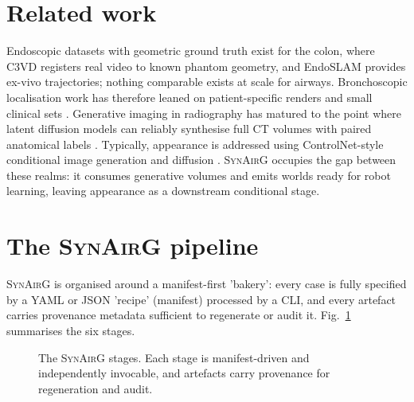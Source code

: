 \documentclass[conference]{IEEEtran}
\newcommand{\synairg}{\textsc{SynAirG}}
\begin{document}
\section{Related work}
Endoscopic datasets with geometric ground truth exist for the colon, where C3VD \cite{bobrow2023c3vd} registers real video to known phantom geometry, and EndoSLAM \cite{ozyoruk2021endoslam} provides ex-vivo trajectories; nothing comparable exists at scale for airways. Bronchoscopic localisation work has therefore leaned on patient-specific renders and small clinical sets \cite{visentini2017deep,shen2019context}. Generative imaging in radiography has matured to the point where latent diffusion models can reliably synthesise full CT volumes with paired anatomical labels \cite{guo2024maisi}. Typically, appearance is addressed using ControlNet-style conditional image generation \cite{zhang2023controlnet} and diffusion \cite{li2024endora}. \synairg{} occupies the gap between these realms: it consumes generative volumes and emits worlds ready for robot learning, leaving appearance as a downstream conditional stage.

\section{The \synairg{} pipeline}
\synairg{} is organised around a manifest-first 'bakery': every case is fully specified by a YAML or JSON 'recipe' (manifest) processed by a CLI, and every artefact carries provenance metadata sufficient to regenerate or audit it. Fig.~\ref{fig:pipeline} summarises the six stages.

\begin{figure}[t]
\centering
{}
\caption{The \synairg{} stages. Each stage is manifest-driven and independently invocable, and artefacts carry provenance for regeneration and audit.}
\label{fig:pipeline}
\end{figure}
\end{document}
